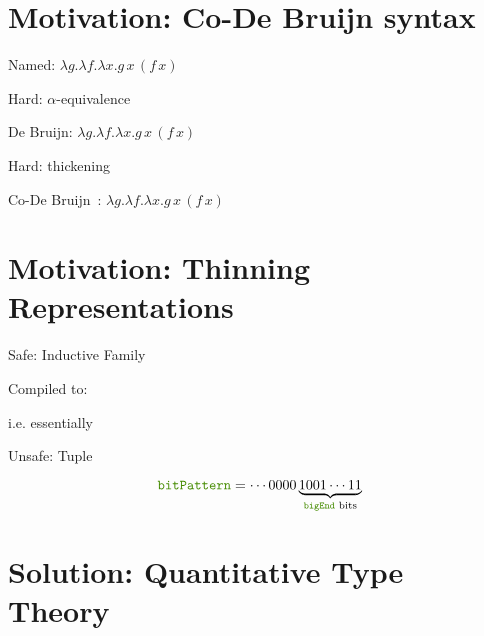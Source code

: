 \documentclass{beamer}
\begin{document}
\section{Motivation: Co-De Bruijn syntax}

\begin{frame}{Named: $\lambda{}g.\lambda{}f.\lambda{}x.g\,x\,(f\,x)$}
\vfill
{}

\vfill
Hard: $\alpha$-equivalence
\end{frame}

\begin{frame}{De Bruijn: $\lambda{}g.\lambda{}f.\lambda{}x.g\,x\,(f\,x)$}


\vfill
Hard: thickening
\end{frame}

\begin{frame}{Co-De Bruijn~\cite{DBLP:journals/corr/abs-1807-04085}: $\lambda{}g.\lambda{}f.\lambda{}x.g\,x\,(f\,x)$}

\end{frame}

\section{Motivation: Thinning Representations}

\begin{frame}{Safe: Inductive Family}

\vfill

Compiled to:


i.e. essentially  
\end{frame}

\begin{frame}{Unsafe: Tuple}

\vfill

$$
\text{\IdrisFunction{bitPattern}} = \cdots0000\underbrace{1001\cdots11}_{\text{\IdrisFunction{bigEnd} bits}}
$$

\end{frame}

\section{Solution: Quantitative Type Theory}
\end{document}
